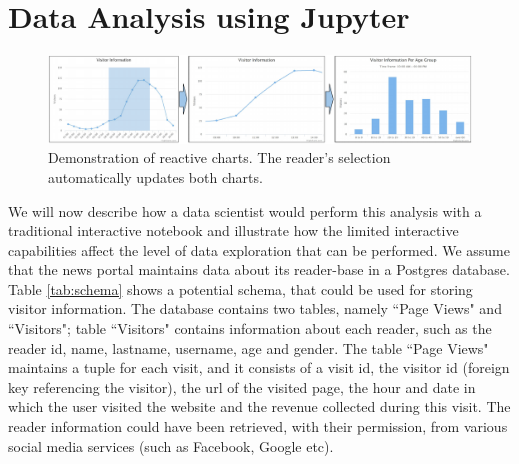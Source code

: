 
\section{Data Analysis using Jupyter}


\begin{figure}[hbt!]
\centering
	\includegraphics[width=1\textwidth]{figures/reactive-processing2.pdf}
	\caption{Demonstration of reactive charts. The reader's selection automatically updates both charts.}
	\label{fig:reactive-data-processing}
	\vspace{-6pt}
\end{figure}






We will now describe how a data scientist would perform this analysis with a traditional interactive notebook and illustrate how the limited interactive capabilities affect the level of data exploration that can be performed. We assume that the news portal maintains data about its reader-base in a Postgres database. Table \ref{tab:schema} shows a potential schema, that could be used for storing visitor information. The database contains two tables, namely ``Page Views" and ``Visitors"; table ``Visitors" contains information about each reader, such as the reader id, name, lastname, username, age and gender. The table ``Page Views" maintains a tuple for each visit, and it consists of a visit id, the visitor id (foreign key referencing the visitor), the url of the visited page, the hour and date in which the user visited the website and the revenue collected during this visit. The reader information could have been retrieved, with their permission, from various social media services (such as Facebook, Google etc). 

